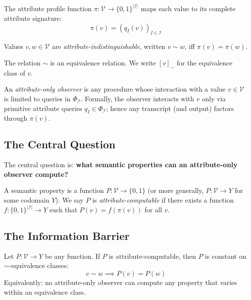 \begin{definition}
The attribute profile function $\pi: \mathcal{V} \to \{0,1\}^{|\mathcal{I}|}$ maps each value to its complete attribute signature:
\[
\pi(v) = (q_I(v))_{I \in \mathcal{I}}
\]
\end{definition}

\begin{definition}
Values $v, w \in \mathcal{V}$ are \emph{attribute-indistinguishable}, written $v \sim w$, iff $\pi(v) = \pi(w)$.
\end{definition}

The relation $\sim$ is an equivalence relation. We write $[v]_\sim$ for the equivalence class of $v$.

\begin{definition}
An \emph{attribute-only observer} is any procedure whose interaction with a value $v \in \mathcal{V}$ is limited to queries in $\Phi_{\mathcal{I}}$. Formally, the observer interacts with $v$ only via primitive attribute queries $q_I \in \Phi_{\mathcal{I}}$; hence any transcript (and output) factors through $\pi(v)$.
\end{definition}

\subsection{The Central Question}

The central question is: \textbf{what semantic properties can an attribute-only observer compute?}

A semantic property is a function $P: \mathcal{V} \to \{0,1\}$ (or more generally, $P: \mathcal{V} \to Y$ for some codomain $Y$). We say $P$ is \emph{attribute-computable} if there exists a function $f: \{0,1\}^{|\mathcal{I}|} \to Y$ such that $P(v) = f(\pi(v))$ for all $v$.

\subsection{The Information Barrier}

\begin{theorem}\label{thm:information-barrier}
Let $P: \mathcal{V} \to Y$ be any function. If $P$ is attribute-computable, then $P$ is constant on $\sim$-equivalence classes:
\[
v \sim w \implies P(v) = P(w)
\]
Equivalently: no attribute-only observer can compute any property that varies within an equivalence class.
\end{theorem}


